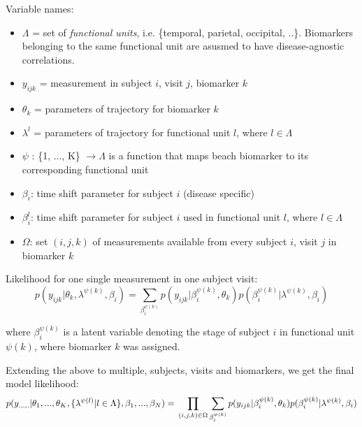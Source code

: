 \documentclass{llncs}
\begin{document}
Variable names:
\begin{itemize}
 \item $\Lambda$ = set of \emph{functional units}, i.e. \{temporal, parietal, occipital, ..\}. Biomarkers belonging to the same functional unit are asusmed to have disease-agnostic correlations.
 \item $y_{ijk}$ = measurement in subject $i$, visit $j$, biomarker $k$
 \item $\theta_k$ = parameters of trajectory for biomarker $k$
 \item $\lambda^l$ = parameters of trajectory for functional unit $l$, where $l \in \Lambda$
 \item $\psi$ : \{1, ..., K\} $ \rightarrow \Lambda$ is a function that maps beach biomarker to its corresponding functional unit
 \item $\beta_i$: time shift parameter for subject $i$ (disease specific)
 \item $\beta_i^{l}$: time shift parameter for subject $i$ used in functional unit $l$, where $l \in \Lambda$
 \item $\Omega$: set ${(i,j,k)}$ of measurements available from every subject $i$, visit $j$ in biomarker $k$
\end{itemize}

Likelihood for one single measurement in one subject visit: 
\begin{equation}
 p(y_{ijk}|\theta_k, \lambda^{\psi(k)}, \beta_i) = \sum_{\beta_i^{\psi(k)}} p(y_{ijk}| \beta_i^{\psi(k)}, \theta_k) p(\beta_i^{\psi(k)}| \lambda^{\psi(k)}, \beta_i)
\end{equation}

where $\beta_i^{\psi(k)}$ is a latent variable denoting the stage of subject $i$ in functional unit $\psi(k)$, where biomarker $k$ was assigned.

Extending the above to multiple, subjects, visits and biomarkers, we get the final model likelihood:
\begin{equation}
 p(y_{.,.,.}|\theta_1, ..., \theta_K, \{\lambda^{\psi(l)} | l \in \Lambda \}, \beta_1, ..., \beta_N) = \\ \prod_{(i,j,k) \in \Omega} \sum_{\beta_i^{\psi(k)}} p(y_{ijk}| \beta_i^{\psi(k)}, \theta_k) p(\beta_i^{\psi(k)}| \lambda^{\psi(k)}, \beta_i)
\end{equation}
\end{document}
